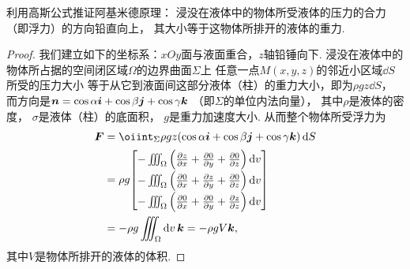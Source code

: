 \begin{example}
利用高斯公式推证阿基米德原理：
浸没在液体中的物体所受液体的压力的合力（即浮力）的方向铅直向上，
其大小等于这物体所排开的液体的重力.
\begin{proof}
我们建立如下的坐标系：\(xOy\)面与液面重合，\(z\)轴铅锤向下.
浸没在液体中的物体所占据的空间闭区域\(\Omega\)的边界曲面\(\Sigma\)上
任意一点\(M(x,y,z)\)的邻近小区域\(\dd{S}\)所受的压力大小
等于从它到液面间这部分液体（柱）的重力大小，即为\(\rho g z \dd{S}\)，
而方向是\(\boldsymbol{n}=\cos\alpha\boldsymbol{i}+\cos\beta\boldsymbol{j}+\cos\gamma\boldsymbol{k}\)
（即\(\Sigma\)的单位内法向量），
其中\(\rho\)是液体的密度，
\(\sigma\)是液体（柱）的底面积，
\(g\)是重力加速度大小.
从而整个物体所受浮力为\begin{align*}
	\vb{F}
	&= \oiint_\Sigma \rho g z
		(\cos\alpha\vb{i}+\cos\beta\vb{j}+\cos\gamma\vb{k}) \dd{S} \\
	&= \rho g {\def\arraystretch{1.5} \begin{bmatrix}
			-\iiint_\Omega \left( \pdv{z}{x} + \pdv{0}{y} + \pdv{0}{z} \right) \dd{v} \\
			-\iiint_\Omega \left( \pdv{0}{x} + \pdv{z}{y} + \pdv{0}{z} \right) \dd{v} \\
			-\iiint_\Omega \left( \pdv{0}{x} + \pdv{0}{y} + \pdv{z}{z} \right) \dd{v}
		\end{bmatrix}} \\
	&= -\rho g \iiint_\Omega \dd{v} \vb{k}
	= -\rho g V \vb{k},
\end{align*}
其中\(V\)是物体所排开的液体的体积.
\end{proof}
\end{example}
